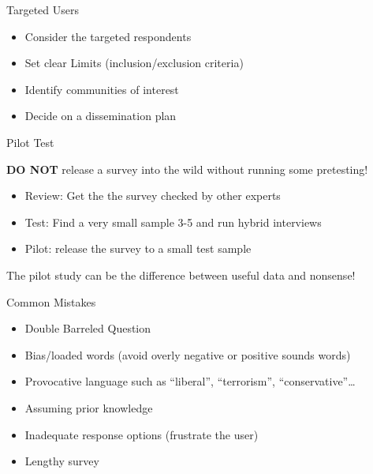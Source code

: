\documentclass[ignorenonframetext,]{beamer}
\providecommand{\tightlist}{%
  \setlength{\itemsep}{0pt}\setlength{\parskip}{0pt}}
\begin{document}
\begin{frame}{Targeted Users}

\begin{itemize}
\tightlist
\item
  Consider the targeted respondents
\item
  Set clear Limits (inclusion/exclusion criteria)
\item
  Identify communities of interest
\item
  Decide on a dissemination plan
\end{itemize}

\end{frame}

\begin{frame}{Pilot Test}

\textbf{DO NOT} release a survey into the wild without running some
pretesting!

\begin{itemize}
\tightlist
\item
  Review: Get the the survey checked by other experts
\item
  Test: Find a very small sample 3-5 and run hybrid interviews
\item
  Pilot: release the survey to a small test sample
\end{itemize}

The pilot study can be the difference between useful data and nonsense!

\end{frame}

\begin{frame}{ Common Mistakes}

\begin{itemize}
\tightlist
\item
  Double Barreled Question
\item
  Bias/loaded words (avoid overly negative or positive sounds words)
\item
  Provocative language such as ``liberal'', ``terrorism'',
  ``conservative''\ldots{}
\item
  Assuming prior knowledge
\item
  Inadequate response options (frustrate the user)
\item
  Lengthy survey
\end{itemize}

\end{frame}
\end{document}
